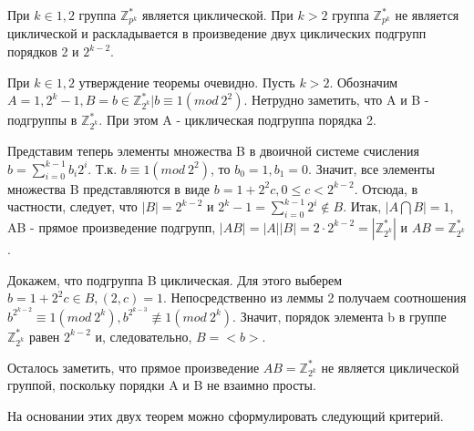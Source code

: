 \begin{proofs}
	При $k \in {1,2}$ группа $\mathbb{Z}_{p^{k}}^{*}$ является циклической. При $k > 2$ группа $\mathbb{Z}_{p^{k}}^{*}$ не является циклической и раскладывается в произведение двух циклических подгрупп порядков 2 и $2^{k-2}$.
	\begin{dokvo}
		При $k \in {1,2}$ утверждение теоремы очевидно.
		Пусть $k > 2$. Обозначим $A = {1, 2^{k}-1}, B = {b \in \mathbb{Z}_{2^{k}}^{*} | b \equiv 1 (mod\ 2^{2})}$. Нетрудно заметить, что A и B - подгруппы в $\mathbb{Z}_{2^{k}}^{*}$. При этом A - циклическая подгруппа порядка 2.

		Представим теперь элементы множества B в двоичной системе счисления $b = \sum_{i=0}^{k-1}b_{i}2^{i}$. Т.к. $b \equiv 1(mod\ 2^2)$, то $b_0 = 1, b_1 = 0$. Значит, все элементы множества B представляются в виде $b = 1 + 2^{2}c, 0 \leq c < 2^{k-2}$. Отсюда, в частности, следует, что $|B| = 2^{k-2}$ и $2^{k}-1 = \sum_{i=0}^{k-1}2^{i} \notin B$.
		Итак, $|A \bigcap B| = 1$, AB - прямое произведение подгрупп, $|AB|=|A||B|=2 \cdot 2^{k-2} = |\mathbb{Z}_{2^{k}}^{*}|$ и $AB = \mathbb{Z}_{2^{k}}^{*}$.

		Докажем, что подгруппа B циклическая. Для этого выберем $b = 1 + 2^{2}c \in B, (2,c)=1$. Непосредственно из леммы 2 получаем соотношения $b^{2^{k-2}} \equiv 1 (mod\ 2^{k}), b^{2^{k-3}} \not\equiv 1(mod\ 2^{k})$.
		Значит, порядок элемента b в группе $\mathbb{Z}_{2^{k}}^{*}$ равен $2^{k-2}$ и, следовательно, $B=<b>$.

		Осталось заметить, что прямое произведение $AB = \mathbb{Z}_{2^{k}}^{*}$ не является циклической группой, поскольку порядки A и B не взаимно просты.
	\end{dokvo}
\end{proofs}

На основании этих двух теорем можно сформулировать следующий критерий.

